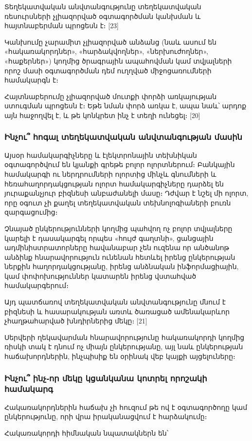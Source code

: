\documentclass[12pt]{article}
\begin{document}
\begin{sloppypar}
Տեղեկատվական անվտանգությունը տեղեկատվական ռեսուրսների չլիազորված օգտագործման
կանխման և հայտնաբերման պրոցեսն է։ [23]

Կանխումը չարամիտ չլիազորված անձանց (նաև ասում են «հակառակորդներ»,
«հարձակվողներ», «ներխուժողներ», «հաքերներ») կողմից ծրագրային ապահովման կամ
տվյալների որոշ մասի օգտագործման դեմ ուղղված միջոցառումների համակարգն է։

Հայտնաբերումը չլիազորված մուտքի փորձի առկայության ստուգման պրոցեսն է։ Եթե
նման փորձ առկա է, ապա նաև՝ արդոք այն հաջողվել է, և թե կոնկրետ ինչ է տեղի
ունեցել։ [20]

\subsubsection{Ինչու՞ հոգալ տեղեկատվական անվտանգության մասին}

Այսօր համակարգիչները և էլեկտրոնային տեխնիկան օգտագործվում են
կյանքի գրեթե բոլոր ոլորտներում։ Բանկային համակարգի ու ներդրումների ոլորտից
մինչև գնումների և հեռահաղորդակցության ոլորտ համակարգիչները դարձել են
յուրաքանչյուր բիզնեսի անբաժանելի մասը։ Դժվար է նշել մի ոլորտ, որը
օգուտ չի քաղել տեղեկատվական տեխնոլոգիաների բուռն զարգացումից։

Չնայած ընկերությունների կողմից պահվող ոչ բոլոր տվյալները կարելի է
դասակարգել որպես «հույժ գաղտնի», ցանցային ադմինիստրատորները հավանաբար
չեն ուզենա որ անծանոթ անձինք հնարավորություն ունենան հետևել
իրենց ընկերության ներքին հաղորդակցությանը,
իրենց անձնական ինֆորմացիային, կամ փոփոխություններ կատարեն իրենց վստահված
համակարգերում։

Այդ պատճառով տեղեկատվական անվտանգությունը մնում է բիզնեսի և հասարակության
առտև ծառացած ամենակարևոր չհաղթահարված խնդիրներից մեկը։ [21]

Սերվերի ղեկավարման հնարավորությունը հակառակորդի կողմից ռիսկի տակ է
դնում ոչ միայն ընկերությանը, այլ նաև ընկերության հաճախորդներին, ինչպիսիք են
օրինակ վեբ կայքի այցելուները։


\subsubsection{Ինչու՞ ինչ֊որ մեկը կցանկանա կոտրել որոշակի համակարգ}


Հակառակորդներին հաճախ չի հուզում թե ով է օգտագործողը կամ ընկերությունը,
որի վրա իրականացվում է հարձակումը։

Հակառակորդի հիմնական նպատակներն են՝


\end{sloppypar}
\end{document}
